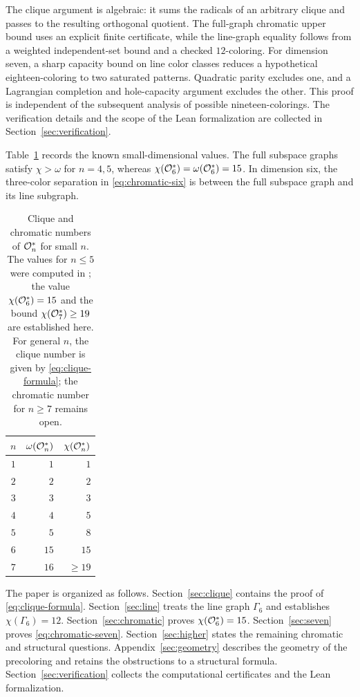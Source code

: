 The clique argument is algebraic: it sums the radicals of an arbitrary
clique and passes to the resulting orthogonal quotient.  The
full-graph chromatic upper bound uses an explicit finite certificate,
while the line-graph equality follows from a weighted independent-set
bound and a checked \(12\)-coloring.  For dimension seven, a sharp capacity bound on line color classes
reduces a hypothetical eighteen-coloring to two saturated patterns.
Quadratic parity excludes one, and a Lagrangian completion and
hole-capacity argument excludes the other. This proof is independent
of the subsequent analysis of possible nineteen-colorings.
The verification details and the scope of the Lean formalization are collected in
Section~\ref{sec:verification}.

Table~\ref{tab:small-values} records the known small-dimensional values.
The full subspace graphs satisfy \(\chi>\omega\) for \(n=4,5\), whereas
\(\chi(\mathcal O_6^*)=\omega(\mathcal O_6^*)=15\). In dimension six, the
three-color separation in \eqref{eq:chromatic-six} is between the full
subspace graph and its line subgraph.

\begin{table}[htbp]
\centering
\begin{tabular}{c|r|r}
\toprule
\(n\) & \(\omega(\mathcal O_n^*)\) & \(\chi(\mathcal O_n^*)\) \\
\midrule
\(1\) & \(1\)  & \(1\)  \\
\(2\) & \(2\)  & \(2\)  \\
\(3\) & \(3\)  & \(3\)  \\
\(4\) & \(4\)  & \(5\)  \\
\(5\) & \(5\)  & \(8\)  \\
\(6\) & \(15\) & \(15\) \\
\(7\) & \(16\) & \(\geq19\) \\
\bottomrule
\end{tabular}
\caption{Clique and chromatic numbers of \(\mathcal O_n^*\) for small \(n\).
The values for \(n\le5\) were computed in \cite{Nikandish2026}; the
value \(\chi(\mathcal O_6^*)=15\) and the bound
\(\chi(\mathcal O_7^*)\geq19\) are established here.  For general \(n\),
the clique number is given by \eqref{eq:clique-formula}; the chromatic
number for \(n\ge7\) remains open.}
\label{tab:small-values}
\end{table}

The paper is organized as follows.  Section~\ref{sec:clique} contains
the proof of \eqref{eq:clique-formula}.
Section~\ref{sec:line} treats the line graph \(\Gamma_6\) and
establishes \(\chi(\Gamma_6)=12\).
Section~\ref{sec:chromatic} proves \(\chi(\mathcal O_6^*)=15\).
Section~\ref{sec:seven} proves \eqref{eq:chromatic-seven}.
Section~\ref{sec:higher} states the remaining chromatic and structural
questions. Appendix~\ref{sec:geometry} describes the geometry of the
precoloring and retains the obstructions to a structural formula.
Section~\ref{sec:verification} collects the computational
certificates and the Lean formalization.
